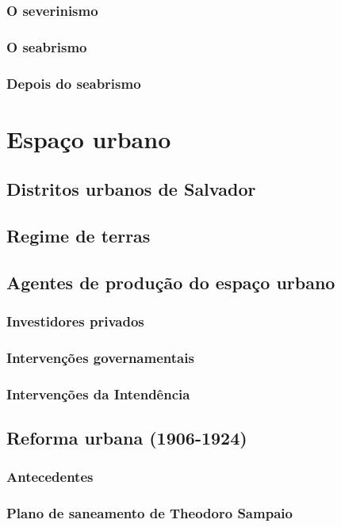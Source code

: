 \documentclass[
	12pt,					%
	openright,			%
	twoside,			%
	a4paper,			%
	english,				%
	french,				%
	spanish,			%
	brazil				%
	]{abntex2}
\begin{document}
\subsubsection{O severinismo}
\lipsum[50]
\subsubsection{O seabrismo}
\lipsum[50]
\subsubsection{Depois do seabrismo}
\lipsum[50]
\section{Espaço urbano}\label{sec:1.3}
\lipsum[50]
\subsection{Distritos urbanos de Salvador}\label{subsec:1.3.1}
\lipsum[50]
\subsection{Regime de terras}\label{subsec:1.3.2}
\lipsum[50]
\subsection{Agentes de produção do espaço urbano}\label{subsec:1.3.3}
\lipsum[50]
\subsubsection{Investidores privados}
\lipsum[50]
\subsubsection{Intervenções governamentais}
\lipsum[50]
\subsubsection{Intervenções da Intendência}
\lipsum[50]
\subsection{Reforma urbana (1906-1924)}
\lipsum[50]
\subsubsection{Antecedentes}
\lipsum[50]
\subsubsection{Plano de saneamento de Theodoro Sampaio}
\lipsum[50]
\end{document}
